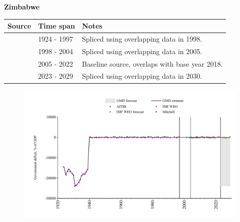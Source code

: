 \documentclass[12pt,a4paper,landscape]{article}
\begin{document}
\begin{adjustbox}{max totalsize={\paperwidth}{\paperheight},center}
\begin{minipage}[t][\textheight][t]{\textwidth}
\vspace*{0.5cm}
{}
\begin{center}
{\Large\bfseries Zimbabwe}
\end{center}
\vspace{0.5cm}
\begin{table}[H]
\centering
\small
\begin{tabular}{|l|l|l|}
\hline
\textbf{Source} & \textbf{Time span} & \textbf{Notes} \\
\hline
\rowcolor{white}\cite{Mitchell}& 1924 - 1997 &Spliced using overlapping data in 1998.\\
\rowcolor{lightgray}\cite{AFDB}& 1998 - 2004 &Spliced using overlapping data in 2005.\\
\rowcolor{white}\cite{IMF_WEO}& 2005 - 2022 &Baseline source, overlaps with base year 2018.\\
\rowcolor{lightgray}\cite{IMF_WEO_forecast}& 2023 - 2029 &Spliced using overlapping data in 2030.\\
\hline
\end{tabular}
\end{table}
\begin{figure}[H]
\centering
\includegraphics[width=\textwidth,height=0.6\textheight,keepaspectratio]{graphs/ZWE_govdef_GDP.pdf}
\end{figure}
\end{minipage}
\end{adjustbox}
\end{document}
